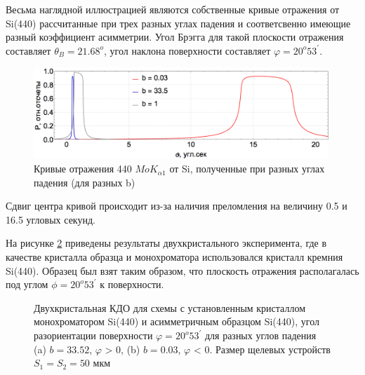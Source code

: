 
  Весьма наглядной иллюстрацией являются собственные кривые отражения от Si(440) рассчитанные при
  трех разных углах падения и соответсвенно имеющие разный коэффициент асимметрии. Угол
  Брэгга для такой плоскости отражения составляет $\theta_B = 21.68^o$, угол наклона поверхности
  составляет $\varphi = 20^o 53^{'}$.

  \begin{figure}[H]
  \centering
  \includegraphics[width=0.99\textwidth]{images/rocking_curve_assym_3.png}
  \caption{Кривые отражения 440 $MoK_{\alpha 1}$ от Si, полученные при разных углах падения (для разных b)}
  \label{ris:rocking_curve_assym_3}
  \end{figure}
  Сдвиг центра кривой происходит из-за наличия преломления на величину 0.5 и 16.5 угловых секунд.


  На рисунке \ref{ris:assymetric_exp_50}
  приведены результаты двухкристального эксперимента, где в качестве
  кристалла образца и монохроматора использовался кристалл кремния Si(440). Образец был взят таким
  образом, что плоскость отражения располагалась под углом $\phi = 20^o 53^{'}$ к поверхности.

  \begin{figure}[H]
    \centering
    \hfill
    \caption{Двухкристальная КДО для схемы с установленным кристаллом монохроматором Si(440) и асимметричным образцом Si(440),
    угол разориентации поверхности $\varphi = 20^o53^{'}$ для разных углов падения (a) $b = 33.52$, $\varphi$ > 0, (b) $b = 0.03$, $\varphi$ < 0.
     Размер щелевых устройств $S_1 = S_2 = 50$ мкм}
    \label{ris:assymetric_exp_50}
  \end{figure}

